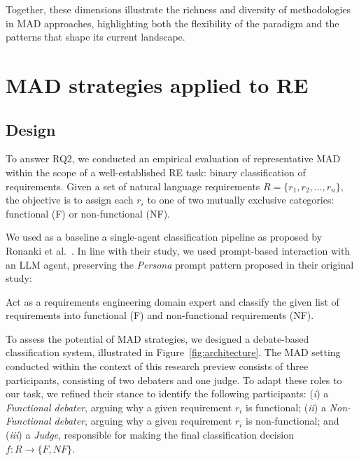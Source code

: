\documentclass[conference]{IEEEtran}
\begin{document}
Together, these dimensions illustrate the richness and diversity of methodologies in MAD approaches, highlighting both the flexibility of the paradigm and the patterns that shape its current landscape.

\section{MAD strategies applied to RE}

\subsection{Design}

To answer RQ2, we conducted an empirical evaluation of representative MAD within the scope of a well-established RE task: binary classification of requirements. Given a set of natural language requirements $R = \{r_1, r_2, \dots, r_n\}$, the objective is to assign each $r_i$ to one of two mutually exclusive categories: functional (F) or non-functional (NF). 

We used as a baseline a single-agent classification pipeline as proposed by Ronanki et al.~\cite{Ronanki2024}. In line with their study, we used prompt-based interaction with an LLM agent, preserving the \textit{Persona} prompt pattern proposed in their original study:

\begin{tcolorbox}[
colback=gray!5!white,
colframe=gray!75!black,
colbacktitle=blue!10!white,
coltitle=black,
title=\textbf{Baseline} (\textit{System prompt}),
boxrule=0.8pt,
left=0.5mm, right=0.5mm, top=0.5mm, bottom=0.5mm
]
Act as a requirements engineering domain expert and classify the given list of requirements into functional (F) and non-functional requirements (NF).
\end{tcolorbox}

To assess the potential of MAD strategies, we designed a debate-based classification system, illustrated in Figure~\ref{fig:architecture}. The MAD setting conducted within the context of this research preview consists of three participants, consisting of two debaters and one judge. To adapt these roles to our task, we refined their stance to identify the following participants: (\textit{i}) a \textit{Functional debater}, arguing why a given requirement $r_i$ is functional; (\textit{ii}) a \textit{Non-Functional debater}, arguing why a given requirement $r_i$ is non-functional; and (\textit{iii}) a \textit{Judge}, responsible for making the final classification decision $f : R \rightarrow \{F, NF\}$.
\end{document}
